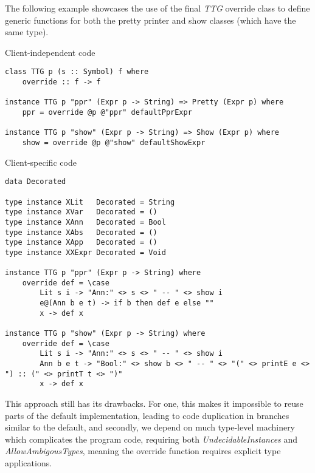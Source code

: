 \documentclass{article}
\begin{document}
The following example showcases the use of the final \emph{TTG} override class
to define generic functions for both the pretty printer and show classes (which
have the same type).

Client-independent code
\begin{lstlisting}
class TTG p (s :: Symbol) f where
    override :: f -> f

instance TTG p "ppr" (Expr p -> String) => Pretty (Expr p) where
    ppr = override @p @"ppr" defaultPprExpr

instance TTG p "show" (Expr p -> String) => Show (Expr p) where
    show = override @p @"show" defaultShowExpr
\end{lstlisting}

Client-specific code
\begin{lstlisting}
data Decorated

type instance XLit   Decorated = String
type instance XVar   Decorated = ()
type instance XAnn   Decorated = Bool
type instance XAbs   Decorated = ()
type instance XApp   Decorated = ()
type instance XXExpr Decorated = Void

instance TTG p "ppr" (Expr p -> String) where
    override def = \case
        Lit s i -> "Ann:" <> s <> " -- " <> show i
        e@(Ann b e t) -> if b then def e else ""
        x -> def x

instance TTG p "show" (Expr p -> String) where
    override def = \case
        Lit s i -> "Ann:" <> s <> " -- " <> show i
        Ann b e t -> "Bool:" <> show b <> " -- " <> "(" <> printE e <> ") :: (" <> printT t <> ")"
        x -> def x
\end{lstlisting}

This approach still has its drawbacks. For one, this makes it impossible to
reuse parts of the default implementation, leading to code duplication in
branches similar to the default, and secondly, we depend on much type-level
machinery which complicates the program code, requiring both
\emph{UndecidableInstances} and \emph{AllowAmbigousTypes}, meaning the override
function requires explicit type applications.
\end{document}
